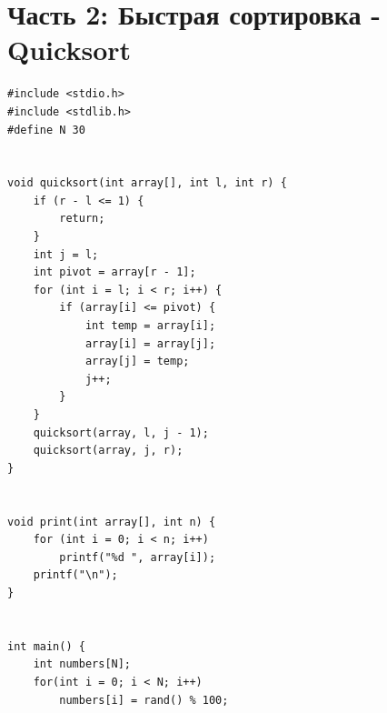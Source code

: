 \documentclass{article}
\begin{document}
\section*{Часть 2: Быстрая сортировка - Quicksort}
\begin{multicols}{2}
\begin{lstlisting}
#include <stdio.h>
#include <stdlib.h>
#define N 30


void quicksort(int array[], int l, int r) {
    if (r - l <= 1) {
        return;
    }
    int j = l;
    int pivot = array[r - 1];
    for (int i = l; i < r; i++) {
        if (array[i] <= pivot) {
            int temp = array[i];
            array[i] = array[j];
            array[j] = temp;
            j++;
        }
    }
    quicksort(array, l, j - 1);
    quicksort(array, j, r);
}


void print(int array[], int n) {
    for (int i = 0; i < n; i++)
        printf("%d ", array[i]);
    printf("\n");
}


int main() {
    int numbers[N];
    for(int i = 0; i < N; i++)
        numbers[i] = rand() % 100;
    

\end{lstlisting}
\end{multicols}
\end{document}
